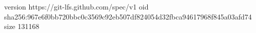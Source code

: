 version https://git-lfs.github.com/spec/v1
oid sha256:967e6f0bb720bbc0c3569c92eb507df824054d32fbca94617968f845a03afd74
size 131168
